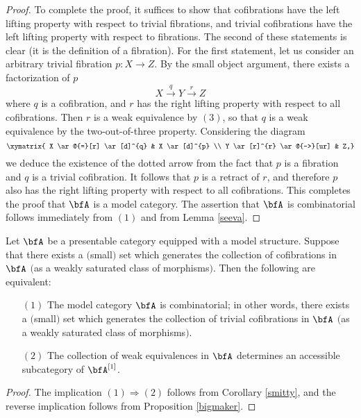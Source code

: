 \begin{Model Categories}
\begin{proof}
To complete the proof, it suffices to show that cofibrations have the left lifting property with respect to trivial fibrations, and trivial cofibrations have the left lifting property with respect to fibrations. The second of these statements is clear (it is the definition of a fibration). For the first statement, let us consider an arbitrary trivial fibration $p: X \rightarrow Z$. By the small object argument,
there exists a factorization of $p$
$$ X \stackrel{q}{\rightarrow} Y \stackrel{r}{\rightarrow} Z$$
where $q$ is a cofibration, and $r$ has the right lifting property with respect to all cofibrations.
Then $r$ is a weak equivalence by $(3)$, so that $q$ is a weak equivalence by the two-out-of-three property. Considering the diagram
$$ \xymatrix{ X \ar@{=}[r] \ar[d]^{q} & X \ar[d]^{p} \\
Y \ar[r]^{r} \ar@{-->}[ur] & Z,}$$
we deduce the existence of the dotted arrow from the fact that $p$ is a fibration and $q$ is a trivial
cofibration. It follows that $p$ is a retract of $r$, and therefore $p$ also has the right lifting property with respect to all cofibrations. This completes the proof that $\bfA$ is a model category. The assertion that $\bfA$ is combinatorial follows immediately from $(1)$ and from Lemma \ref{seeva}.
\end{proof}

\begin{corollary}\label{uryt}
Let $\bfA$ be a presentable category equipped with a model structure. Suppose that there exists
a $($small$)$ set which generates the collection of cofibrations in $\bfA$ $($as a weakly saturated class of morphisms$)$. Then the following are equivalent:
\begin{itemize}
\item[$(1)$] The model category $\bfA$ is combinatorial; in other words, there exists a $($small$)$ set which generates the collection of trivial cofibrations in $\bfA$ $($as a weakly saturated class of morphisms$)$.
\item[$(2)$] The collection of weak equivalences in $\bfA$ determines an accessible subcategory
of $\bfA^{[1]}$. 
\end{itemize}
\end{corollary}

\begin{proof}
The implication $(1) \Rightarrow (2)$ follows from Corollary \ref{smitty}, and the reverse implication follows from Proposition \ref{bigmaker}.
\end{proof}


\end{Model Categories}
